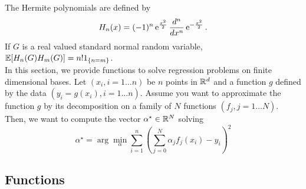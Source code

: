 The Hermite polynomials are defined by
\begin{equation*}
  H_n(x) = (-1)^n \operatorname{e}^{ \frac{x^2}{2} } \frac{d^n}{dx^n} \operatorname{e}^{ -\frac{x^2}{2} }.
\end{equation*}
If $G$ is a real valued standard normal random variable, ${\mathbb E}[H_n(G) H_m(G)] = n!
1_{\left\{n = m\right\}}$. \\

In this section, we provide functions to solve regression problems on
finite dimensional bases. Let $(x_i, i=1 \dots n)$ be $n$ points in ${\mathbb R}^d$ and a
function $g$ defined by the data $(y_i = g(x_i), i=1 \dots n)$. Assume you
want to approximate the function $g$ by its decomposition on a family of $N$
functions $(f_j, j=1\dots N)$. Then, we want to compute the vector
$\alpha^\star \in {\mathbb R}^N$ solving
\begin{equation*} \alpha^\star = \arg\min_\alpha \sum_{i=1}^{n}
  \left(\sum_{j=0}^N \alpha_j f_j(x_i) - y_i\right)^2
\end{equation*}

\subsection{Functions}

